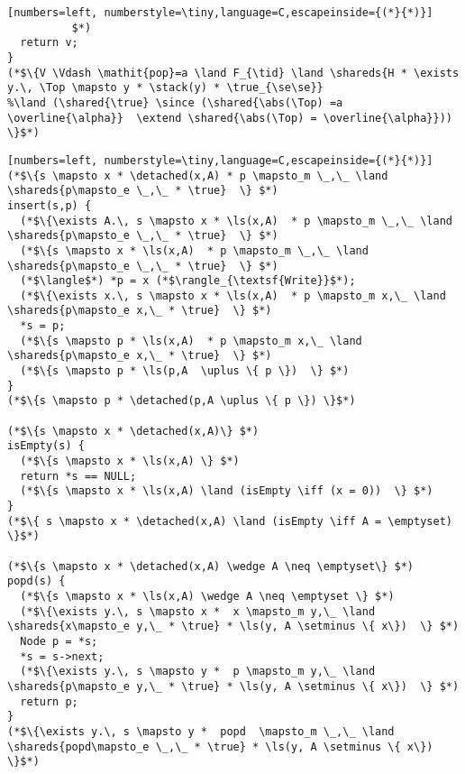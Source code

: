 \begin{figure*}
{\begin{lstlisting}[numbers=left, numberstyle=\tiny,language=C,escapeinside={(*}{*)}]
          $*)          
  return v; 
}
(*$\{V \Vdash \mathit{pop}=a \land F_{\tid} \land \shareds{H * \exists y.\, \Top \mapsto y * \stack(y) * \true_{\se\se}} 
%\land (\shared{\true} \since (\shared{\abs(\Top) =a \overline{\alpha}}  \extend \shared{\abs(\Top) = \overline{\alpha}})) 
\}$*)          
\end{lstlisting}
}
\caption{Proof outline for {\tt pop} for a stack with hazard pointers.  Here
$V$ is $x$, $p$, $p2$, $n$, $v$.\label{fig:HazardPop}
}
\end{figure*}

\begin{figure*}
{\small
\begin{lstlisting}[numbers=left, numberstyle=\tiny,language=C,escapeinside={(*}{*)}]
(*$\{s \mapsto x * \detached(x,A) * p \mapsto_m \_,\_ \land \shareds{p\mapsto_e \_,\_ * \true}  \} $*)
insert(s,p) {
  (*$\{\exists A.\, s \mapsto x * \ls(x,A)  * p \mapsto_m \_,\_ \land \shareds{p\mapsto_e \_,\_ * \true}  \} $*)
  (*$\{s \mapsto x * \ls(x,A)  * p \mapsto_m \_,\_ \land \shareds{p\mapsto_e \_,\_ * \true}  \} $*)
  (*$\langle$*) *p = x (*$\rangle_{\textsf{Write}}$*);
  (*$\{\exists x.\, s \mapsto x * \ls(x,A)  * p \mapsto_m x,\_ \land \shareds{p\mapsto_e x,\_ * \true}  \} $*)
  *s = p;
  (*$\{s \mapsto p * \ls(x,A)  * p \mapsto_m x,\_ \land \shareds{p\mapsto_e x,\_ * \true}  \} $*)
  (*$\{s \mapsto p * \ls(p,A  \uplus \{ p \})  \} $*)
}
(*$\{s \mapsto p * \detached(p,A \uplus \{ p \}) \}$*)

(*$\{s \mapsto x * \detached(x,A)\} $*)
isEmpty(s) {
  (*$\{s \mapsto x * \ls(x,A) \} $*)
  return *s == NULL;
  (*$\{s \mapsto x * \ls(x,A) \land (isEmpty \iff (x = 0))  \} $*)
}
(*$\{ s \mapsto x * \detached(x,A) \land (isEmpty \iff A = \emptyset) \}$*)

(*$\{s \mapsto x * \detached(x,A) \wedge A \neq \emptyset\} $*)
popd(s) {
  (*$\{s \mapsto x * \ls(x,A) \wedge A \neq \emptyset \} $*)
  (*$\{\exists y.\, s \mapsto x *  x \mapsto_m y,\_ \land \shareds{x\mapsto_e y,\_ * \true} * \ls(y, A \setminus \{ x\})  \} $*)
  Node p = *s;
  *s = s->next;
  (*$\{\exists y.\, s \mapsto y *  p \mapsto_m y,\_ \land \shareds{p\mapsto_e y,\_ * \true} * \ls(y, A \setminus \{ x\})  \} $*)
  return p;
}
(*$\{\exists y.\, s \mapsto y *  popd  \mapsto_m \_,\_ \land \shareds{popd\mapsto_e \_,\_ * \true} * \ls(y, A \setminus \{ x\}) \}$*)


\end{lstlisting}}
\end{figure*}
